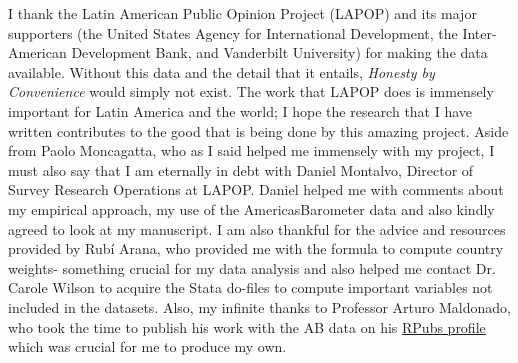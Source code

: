 \documentclass[12pt,a4]{article}\usepackage[]{graphicx}\usepackage[]{xcolor}
\begin{document}
I thank the Latin American Public Opinion Project (LAPOP) and its major supporters (the United States Agency for International Development, the Inter-American Development Bank, and Vanderbilt University) for making the data available. Without this data and the detail that it entails, \textit{Honesty by Convenience} would simply not exist. The work that LAPOP does is immensely important for Latin America and the world; I hope the research that I have written contributes to the good that is being done by this amazing project. Aside from Paolo Moncagatta, who as I said helped me immensely with my project, I must also say that I am eternally in debt with Daniel Montalvo, Director of Survey Research Operations at LAPOP. Daniel helped me with comments about my empirical approach, my use of the AmericasBarometer data and also kindly agreed to look at my manuscript. I am also thankful for the advice and resources provided by Rubí Arana, who provided me with the formula to compute country weights- something crucial for my data analysis and also helped me contact Dr. Carole Wilson to acquire the Stata do-files to compute important variables not included in the datasets. Also, my infinite thanks to Professor Arturo Maldonado, who took the time to publish his work with the AB data on his \href{https://rpubs.com/arturo_maldonado}{RPubs profile} which was crucial for me to produce my own. 
\end{document}
